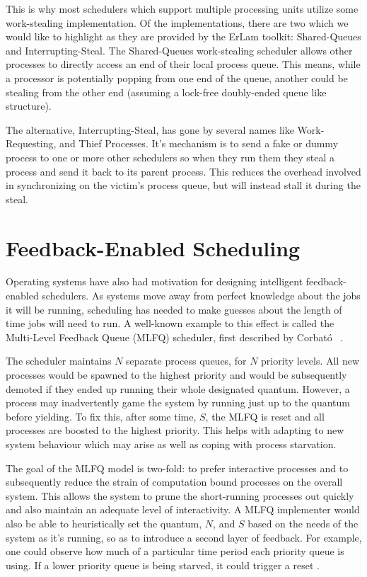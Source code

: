 This is why most schedulers which support multiple processing units utilize 
some work-stealing implementation. Of the implementations, there are two which 
we would like to highlight as they are provided by the ErLam toolkit: 
Shared-Queues and Interrupting-Steal. The Shared-Queues work-stealing scheduler
allows other processes to directly access an end of their local process queue. 
This means, while a processor is potentially popping from one end of the queue,
another could be stealing from the other end (assuming a lock-free doubly-ended 
queue like structure).

The alternative, Interrupting-Steal, has gone by several names like 
Work-Requesting, and Thief Processes. It's mechanism is to send a fake or 
dummy process to one or more other schedulers so when they run them they steal
a process and send it back to its parent process. This reduces the overhead 
involved in synchronizing on the victim's process queue, but will instead stall
it during the steal.


\section{Feedback-Enabled Scheduling}

Operating systems have also had motivation for designing intelligent 
feedback-enabled schedulers. As systems move away from perfect knowledge about 
the jobs it will be running, scheduling has needed to make guesses about the 
length of time jobs will need to run. A well-known example to this effect is
called the Multi-Level Feedback Queue (MLFQ) scheduler, first described by 
Corbat{\'o} \etal~\cite{corbato1962experimental,ArpaciDusseau14Book}.

The scheduler maintains $N$ separate process queues, for $N$ priority levels. 
All new processes would be spawned to the highest priority and would be 
subsequently demoted if they ended up running their whole designated quantum. 
However, a process may inadvertently game the system by running just up to the
quantum before yielding. To fix this, after some time, $S$, the MLFQ is reset 
and all processes are boosted to the highest priority. This helps with adapting 
to new system behaviour which may arise as well as coping with process 
starvation.

The goal of the MLFQ model is two-fold: to prefer interactive processes and 
to subsequently reduce the strain of computation bound processes on the overall 
system. This allows the system to prune the short-running processes out quickly
and also maintain an adequate level of interactivity. A MLFQ implementer would 
also be able to heuristically set the quantum, $N$, and $S$ based on the needs 
of the system as it's running, so as to introduce a second layer of feedback. 
For example, one could observe how much of a particular time period each
priority queue is using. If a lower priority queue is being starved, it could
trigger a reset \cite{hoganson2009reducing}.

